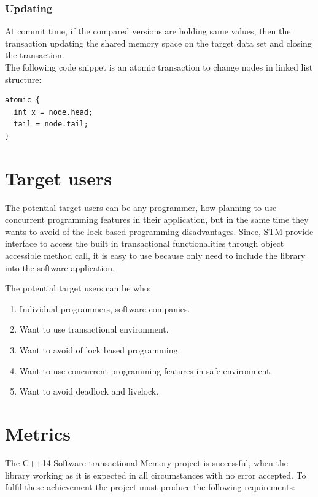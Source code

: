 \documentclass[12pt]{article}
\begin{document}
\subsubsection{Updating}
At commit time, if the compared versions are holding same values, then the transaction updating the shared memory space on the target data set and closing the transaction. \\

The following code snippet is an atomic transaction to change nodes in linked list structure:
\begin{lstlisting}
atomic {
  int x = node.head;
  tail = node.tail;
}
\end{lstlisting}

\section{Target users}
The potential target users can be any programmer, how planning to use concurrent programming features in their application, but in the same time they wants to avoid of the lock based programming disadvantages. Since, STM provide interface to access the built in transactional functionalities through object accessible method call, it is easy to use because only need to include the library into the software application.\\

{\setlength{\parindent}{0cm}
The potential target users can be who:
\begin{enumerate}
\item Individual programmers, software companies. 
\item Want to use transactional environment.
\item Want to avoid of lock based programming.
\item Want to use concurrent programming features in safe environment.
\item Want to avoid deadlock and livelock.
\end{enumerate}
}

\clearpage
\section{Metrics}
The C++14 Software transactional Memory project is successful, when the library working as it is expected in all circumstances with no error accepted. To fulfil these achievement the project must produce the following requirements:\\
\end{document}
